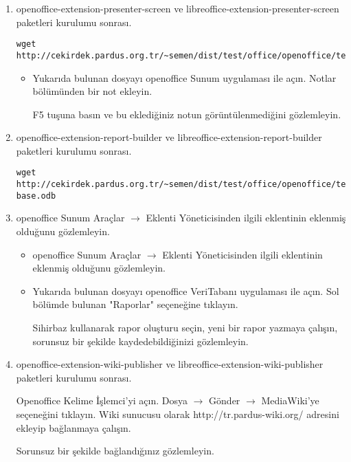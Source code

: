 \documentclass[a4paper,10pt]{article}
\begin{document}
\begin{enumerate}
\item openoffice-extension-presenter-screen ve libreoffice-extension-presenter-screen paketleri kurulumu sonrası.
\begin{verbatim}
wget http://cekirdek.pardus.org.tr/~semen/dist/test/office/openoffice/test_ooimpress.odp
\end{verbatim}

\begin{itemize}


\item Yukarıda bulunan dosyayı openoffice Sunum uygulaması ile açın. Notlar bölümünden bir not ekleyin. 

F5 tuşuna basın ve bu eklediğiniz notun görüntülenmediğini gözlemleyin.

\end{itemize}
\item openoffice-extension-report-builder ve libreoffice-extension-report-builder paketleri kurulumu sonrası.
\begin{verbatim}
wget http://cekirdek.pardus.org.tr/~semen/dist/test/office/openoffice/test_openoffice-base.odb
\end{verbatim}

\item openoffice Sunum Araçlar $\rightarrow$ Eklenti Yöneticisinden ilgili eklentinin eklenmiş olduğunu gözlemleyin.

\begin{itemize}
\item openoffice Sunum Araçlar $\rightarrow$ Eklenti Yöneticisinden ilgili eklentinin eklenmiş olduğunu gözlemleyin.

\item Yukarıda bulunan dosyayı openoffice VeriTabanı uygulaması ile açın. Sol bölümde bulunan "Raporlar" seçeneğine tıklayın.

Sihirbaz kullanarak rapor oluşturu seçin, yeni bir rapor yazmaya çalışın, sorunsuz bir şekilde kaydedebildiğinizi gözlemleyin.

\end{itemize}


\item openoffice-extension-wiki-publisher ve libreoffice-extension-wiki-publisher paketleri kurulumu sonrası.

Openoffice Kelime İşlemci'yi açın. Dosya $\rightarrow$ Gönder $\rightarrow$ MediaWiki'ye seçeneğini tıklayın. Wiki sunucusu olarak http://tr.pardus-wiki.org/ adresini ekleyip bağlanmaya çalışın.

Sorunsuz bir şekilde bağlandığınız gözlemleyin.


\end{enumerate}
\end{document}
